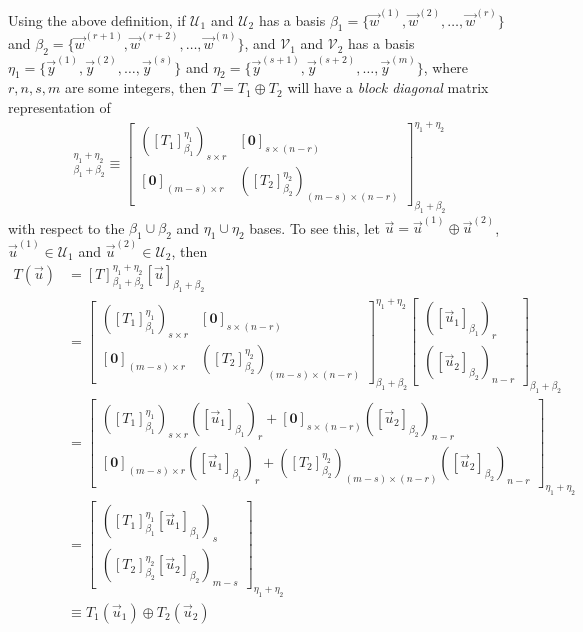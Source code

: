 Using the above definition, if $\mathcal{U}_1$ and $\mathcal{U}_2$ has a basis $\mathcal{\beta}_1 = \{\vec{w}^{(1)}, \vec{w}^{(2)}, \ldots, \vec{w}^{(r)}\}$ and $\mathcal{\beta}_2 = \{\vec{w}^{(r+1)}, \vec{w}^{(r+2)}, \ldots, \vec{w}^{(n)}\}$, and $\mathcal{V}_1$ and $\mathcal{V}_2$ has a basis $\mathcal{\eta}_1 = \{\vec{y}^{(1)}, \vec{y}^{(2)}, \allowbreak \ldots, \vec{y}^{(s)}\}$ and $\mathcal{\eta}_2 = \{\vec{y}^{(s+1)}, \vec{y}^{(s+2)}, \ldots, \vec{y}^{(m)}\}$, where $r, n, s, m$ are some integers, then $T = T_1 \oplus T_2$ will have a \textit{block diagonal} matrix representation of
\begin{align}
[T]_{\beta_1 + \beta_2}^{\eta_1 + \eta_2}
\equiv
\begin{bmatrix}
([T_1]_{\beta_1}^{\eta_1})_{s \times r} & [\textbf{0}]_{s \times (n-r)} \\
[\textbf{0}]_{(m-s) \times r} & ([T_2]_{\beta_2}^{\eta_2})_{(m-s) \times (n-r)}
\end{bmatrix}_{\beta_1 + \beta_2}^{\eta_1 + \eta_2}
\end{align}
with respect to the $\mathcal{\beta}_1 \cup \mathcal{\beta}_2$ and $\mathcal{\eta}_1 \cup \mathcal{\eta}_2$ bases. To see this, let $\vec{u} = \vec{u}^{(1)} \oplus \vec{u}^{(2)}$, $\vec{u}^{(1)} \in \mathcal{U}_1$ and $\vec{u}^{(2)} \in \mathcal{U}_2$, then
\begin{align*}
T(\vec{u}) &= [T]_{\beta_1 + \beta_2}^{\eta_1 + \eta_2}[\vec{u}]_{\beta_1 + \beta_2} \\ 
&= \begin{bmatrix}
([T_1]_{\beta_1}^{\eta_1})_{s \times r} & [\textbf{0}]_{s \times (n-r)} \\
[\textbf{0}]_{(m-s) \times r} & ([T_2]_{\beta_2}^{\eta_2})_{(m-s) \times (n-r)}
\end{bmatrix}_{\beta_1 + \beta_2}^{\eta_1 + \eta_2}
\begin{bmatrix}
([\vec{u}_1]_{\beta_1})_r \\
([\vec{u}_2]_{\beta_2})_{n-r}
\end{bmatrix}_{\beta_1 + \beta_2} \\
&= 
\begin{bmatrix}
([T_1]_{\beta_1}^{\eta_1})_{s \times r}([\vec{u}_1]_{\beta_1})_r + [\textbf{0}]_{s \times (n-r)}([\vec{u}_2]_{\beta_2})_{n-r} \\
[\textbf{0}]_{(m-s) \times r}([\vec{u}_1]_{\beta_1})_r + ([T_2]_{\beta_2}^{\eta_2})_{(m-s) \times (n-r)}([\vec{u}_2]_{\beta_2})_{n-r}
\end{bmatrix}_{\eta_1 + \eta_2} \\
&= 
\begin{bmatrix}
([T_1]_{\beta_1}^{\eta_1}[\vec{u}_1]_{\beta_1})_s \\
([T_2]_{\beta_2}^{\eta_2}[\vec{u}_2]_{\beta_2})_{m-s}
\end{bmatrix}_{\eta_1 + \eta_2} \\
&\equiv
T_1(\vec{u}_1) \oplus T_2(\vec{u}_2)
\end{align*}
